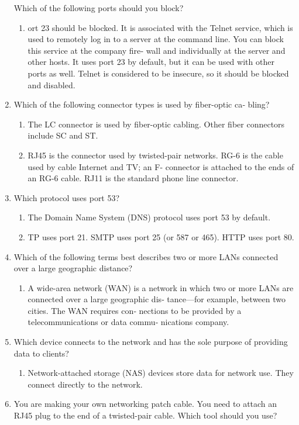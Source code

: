 \documentclass{article}
\begin{document}
\begin{enumerate}
Which of the following ports should you block?
    \begin{enumerate}
        \item ort 23 should be blocked. It is associated with the
Telnet service, which is used to remotely log in to a server at the
command line. You can block this service at the company fire‐
wall and individually at the server and other hosts. It uses port 23
by default, but it can be used with other ports as well. Telnet is
considered to be insecure, so it should be blocked and disabled.
    \end{enumerate}
    \item Which	of	the	following	connector	types	is	used	by	fiber-optic	ca‐
bling?

    \begin{enumerate}
        \item The	LC	connector	is	used	by	fiber-optic	cabling.
Other	fiber	connectors	include	SC	and	ST.
        \item RJ45	is	the	connector	used	by	twisted-pair
networks.	RG-6	is	the	cable	used	by	cable	Internet	and	TV;	an	F-
connector	is	attached	to	the	ends	of	an	RG-6	cable.	RJ11	is	the
standard	phone	line	connector.

    \end{enumerate}
    \item Which	protocol	uses	port	53?

    \begin{enumerate}
        \item The	Domain	Name	System	(DNS)	protocol	uses
port	53	by	default. 
        \item TP	uses	port	21.	SMTP	uses	port	25	(or	587 or	465).	HTTP uses port	80.

    \end{enumerate}
    \item Which	of	the	following	terms	best	describes	two	or	more	LANs
connected	over	a	large	geographic	distance?

    \begin{enumerate}
        \item A	wide-area	network	(WAN)	is	a	network	in	which
two	or	more	LANs	are	connected	over	a	large	geographic	dis‐
tance—for	example,	between	two	cities.	The	WAN	requires	con‐
nections	to	be	provided	by	a	telecommunications	or	data	commu‐
nications	company.
    \end{enumerate} 
        \item Which	device	connects	to	the	network	and	has	the	sole	purpose	of
providing	data	to	clients?
    \begin{enumerate}
        \item Network-attached	storage	(NAS)	devices	store	data
for	network	use.	They	connect	directly	to	the	network.
    \end{enumerate}
    \item You	are	making	your	own	networking	patch	cable.	You	need	to
attach	an	RJ45	plug	to	the	end	of	a	twisted-pair	cable.	Which	tool
should	you	use?


\end{enumerate}
\end{document}
